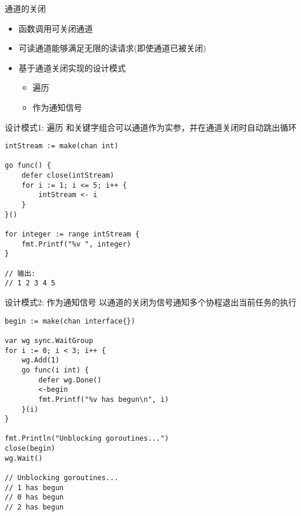 \begin{frame}{通道的关闭}
    \begin{itemize}
        \item {}函数调用可关闭通道
        \item 可读通道能够满足无限的读请求(即使通道已被关闭)
        \item 基于通道关闭实现的设计模式
            \begin{itemize}
                \item {}遍历
                \item 作为通知信号
            \end{itemize}
    \end{itemize}
\end{frame}

\begin{frame}[fragile]{设计模式1: 遍历}
    和关键字组合可以通道作为实参，并在通道关闭时自动跳出循环
\begin{lstlisting}
intStream := make(chan int)

go func() {
    defer close(intStream)
    for i := 1; i <= 5; i++ {
        intStream <- i
    }
}()

for integer := range intStream {
    fmt.Printf("%v ", integer)
}

// 输出:
// 1 2 3 4 5 
\end{lstlisting}    
\end{frame}

\begin{frame}[fragile]{设计模式2: 作为通知信号}
    以通道的关闭为信号通知多个协程退出当前任务的执行
\begin{lstlisting}
begin := make(chan interface{})

var wg sync.WaitGroup
for i := 0; i < 3; i++ {
    wg.Add(1)
    go func(i int) {
        defer wg.Done()
        <-begin
        fmt.Printf("%v has begun\n", i)
    }(i)
}

fmt.Println("Unblocking goroutines...")
close(begin)
wg.Wait()

// Unblocking goroutines...
// 1 has begun
// 0 has begun
// 2 has begun
\end{lstlisting}
\end{frame}

